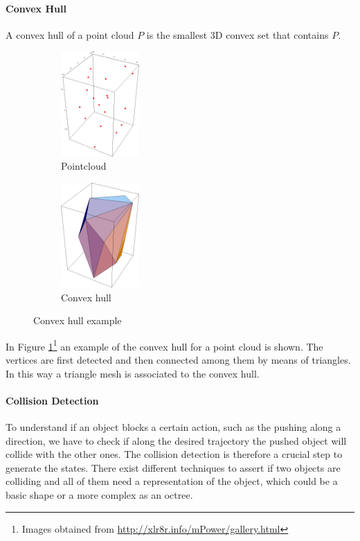 \paragraph{Convex Hull}
A convex hull of a point cloud $P$ is the smallest 3D convex set that contains $P$. 
\begin{figure}[tb]
\centering
\begin{subfigure}[t]{0.3\textwidth}
\centering
\includegraphics[height=4cm]{Img/convexhull/ch1.png}
\caption{Pointcloud}
\end{subfigure}
\begin{subfigure}[t]{0.3\textwidth}
\centering
\includegraphics[height=4cm]{Img/convexhull/ch3.png}
\caption{Convex hull}
\end{subfigure}
\caption{Convex hull example}\label{fig:convexhull_example}
\end{figure}
In Figure \ref{fig:convexhull_example}\footnote{Images obtained from \href{http://xlr8r.info/mPower/gallery.html}{\url{http://xlr8r.info/mPower/gallery.html}}} an example of the convex hull for a point cloud is shown. The vertices are first detected and then connected among them by means of triangles. In this way a triangle mesh is associated to the convex hull. 

\paragraph{Collision Detection}
To understand if an object blocks a certain action, such as the pushing along a direction, we have to check if along the desired trajectory the pushed object will collide with the other ones. The collision detection is therefore a crucial step to generate the states. There exist different techniques to assert if two objects are colliding and all of them need a representation of the object, which could be a basic shape or a more complex as an octree. 

